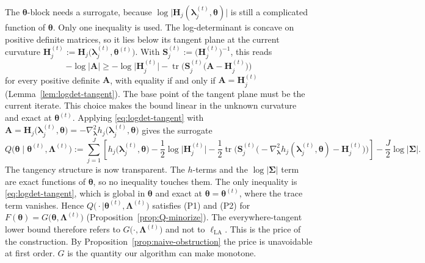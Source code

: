 The $\bm{\theta}$-block needs a surrogate, because $\log\big|\mathbf{H}_{j}(\bm{\lambda}_{j}^{(t)},\bm{\theta})\big|$ is still a complicated function of $\bm{\theta}$. Only one inequality is used. The log-determinant is concave on positive definite matrices, so it lies below its tangent plane at the current curvature $\mathbf{H}_{j}^{(t)}:=\mathbf{H}_{j}\big(\bm{\lambda}_{j}^{(t)},\bm{\theta}^{(t)}\big)$. With $\mathbf{S}_{j}^{(t)}:=\big(\mathbf{H}_{j}^{(t)}\big)^{-1}$, this reads
\begin{equation}
    -\log|\mathbf{A}|\geq-\log\big|\mathbf{H}_{j}^{(t)}\big|-\operatorname{tr}\Big(\mathbf{S}_{j}^{(t)}\big(\mathbf{A}-\mathbf{H}_{j}^{(t)}\big)\Big)
    \label{eq:logdet-tangent}
\end{equation}
for every positive definite $\mathbf{A}$, with equality if and only if $\mathbf{A}=\mathbf{H}_{j}^{(t)}$ (Lemma~\ref{lem:logdet-tangent}). The base point of the tangent plane must be the current iterate. This choice makes the bound linear in the unknown curvature and exact at $\bm{\theta}^{(t)}$. Applying \eqref{eq:logdet-tangent} with $\mathbf{A}=\mathbf{H}_{j}\big(\bm{\lambda}_{j}^{(t)},\bm{\theta}\big)=-\nabla^{2}_{\bm{\lambda}}h_{j}\big(\bm{\lambda}_{j}^{(t)},\bm{\theta}\big)$ gives the surrogate
\begin{equation}
    Q\big(\bm{\theta}\mid\bm{\theta}^{(t)},\bm{\Lambda}^{(t)}\big):=\sum_{j=1}^{J}\left[h_{j}\big(\bm{\lambda}_{j}^{(t)},\bm{\theta}\big)-\frac{1}{2}\log\big|\mathbf{H}_{j}^{(t)}\big|-\frac{1}{2}\operatorname{tr}\Big(\mathbf{S}_{j}^{(t)}\big(-\nabla^{2}_{\bm{\lambda}}h_{j}(\bm{\lambda}_{j}^{(t)},\bm{\theta})-\mathbf{H}_{j}^{(t)}\big)\Big)\right]-\frac{J}{2}\log|\bm{\Sigma}|.
    \label{eq:Q-def}
\end{equation}
The tangency structure is now transparent. The $h$-terms and the $\log|\bm{\Sigma}|$ term are exact functions of $\bm{\theta}$, so no inequality touches them. The only inequality is \eqref{eq:logdet-tangent}, which is global in $\bm{\theta}$ and exact at $\bm{\theta}=\bm{\theta}^{(t)}$, where the trace term vanishes. Hence $Q\big(\cdot\mid\bm{\theta}^{(t)},\bm{\Lambda}^{(t)}\big)$ satisfies (P1) and (P2) for $F(\bm{\theta})=G\big(\bm{\theta},\bm{\Lambda}^{(t)}\big)$ (Proposition~\ref{prop:Q-minorize}). The everywhere-tangent lower bound therefore refers to $G\big(\cdot,\bm{\Lambda}^{(t)}\big)$ and not to $\ell_{\text{LA}}$. This is the price of the construction. By Proposition~\ref{prop:naive-obstruction} the price is unavoidable at first order. $G$ is the quantity our algorithm can make monotone.
 
